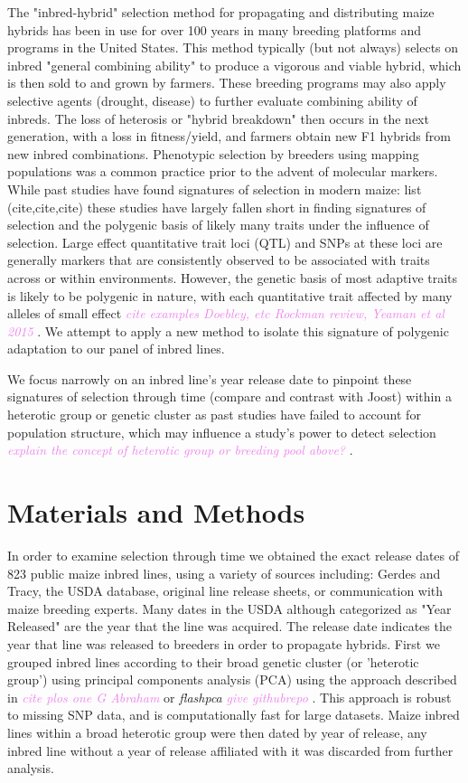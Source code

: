 \documentclass[9pt,twocolumn,twoside]{gsajnl}
\newcommand{\kc}[1]{\textcolor{violet}{ \emph{ #1}} }
\begin{document}
The "inbred-hybrid" selection method for propagating and distributing maize hybrids has been in use for over 100 years in many breeding platforms and programs in the United States. 
This method typically (but not always) selects on inbred "general combining ability" to produce a vigorous and viable hybrid, which is then sold to and grown by farmers. 
These breeding programs may also apply selective agents (drought, disease) to further evaluate combining ability of inbreds.
The loss of heterosis or "hybrid breakdown" then occurs in the next generation, with a loss in fitness/yield, and farmers obtain new F1 hybrids from new inbred combinations.
Phenotypic selection by breeders using mapping populations was a common practice prior to the advent of molecular markers. 
While past studies have found signatures of selection in modern maize: list (cite,cite,cite) these studies have largely fallen short in finding signatures of selection and the polygenic basis of likely many traits under the influence of selection. 
Large effect quantitative trait loci (QTL) and SNPs at these loci are generally markers that are consistently observed to be associated with traits across or within environments. 
However, the genetic basis of most adaptive traits is likely to be polygenic in nature, with each quantitative trait affected by many alleles of small effect \kc{cite examples Doebley, etc Rockman review, Yeaman et al 2015}. We attempt to apply a new method to isolate this signature of polygenic adaptation to our panel of inbred lines.

We focus narrowly on an inbred line's year release date to pinpoint these signatures of selection through time (compare and contrast with Joost) within a heterotic group or genetic cluster as past studies have failed to account for population structure, which may influence a study's power to detect selection \kc{explain the concept of heterotic group or breeding pool above?}. 



\section*{Materials and Methods}

In order to examine selection through time we obtained the exact release dates of 823 public maize inbred lines, using a variety of sources including: Gerdes and Tracy, the USDA database, original line release sheets, or communication with maize breeding experts. Many dates in the USDA although categorized as "Year Released" are the year that the line was acquired. 
The release date indicates the year that line was released to breeders in order to propagate hybrids.
First we grouped inbred lines according to their broad genetic cluster (or 'heterotic group') using principal components analysis (PCA) using the approach described in  \kc{cite plos one G Abraham} or \textit{flashpca} \kc{give githubrepo}. 
This approach is robust to missing SNP data, and is computationally fast for large datasets.  
Maize inbred lines within a broad heterotic group were then dated by year of release, any inbred line without a year of release affiliated with it was discarded from further analysis.
\end{document}
